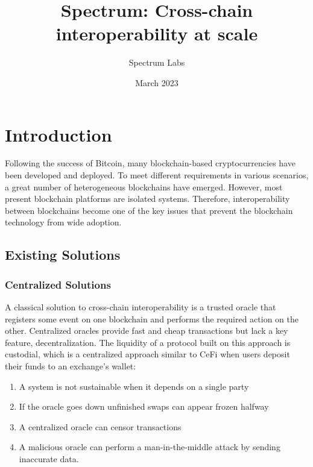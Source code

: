 \documentclass{article}
\title{Spectrum: Cross-chain interoperability at scale}
\author{Spectrum Labs}
\date{March 2023}
\begin{document}
    \pagecolor{SpectrumLavander}
    \begin{sloppypar}

        \maketitle


        \section{Introduction}\label{sec:introduction}

        Following the success of Bitcoin, many blockchain-based cryptocurrencies have been developed and deployed.
        To meet different requirements in various scenarios, a great number of heterogeneous blockchains have emerged.
        However, most present blockchain platforms are isolated systems.
        Therefore, interoperability between blockchains become one of the key issues
        that prevent the blockchain technology from wide adoption.

        \subsection{Existing Solutions}\label{subsec:existing-solutions}

        \subsubsection{Centralized Solutions}\label{subsubsec:centralized-solutions}

        A classical solution to cross-chain interoperability is a trusted oracle that registers some event on one blockchain and performs the required action on the other.
        Centralized oracles provide fast and cheap transactions but lack a key feature, decentralization.
        The liquidity of a protocol built on this approach is custodial, which is a centralized approach similar to CeFi when users deposit their funds to an exchange's wallet:
        \begin{enumerate}
            \item A system is not sustainable when it depends on a single party
            \item If the oracle goes down unfinished swaps can appear frozen halfway
            \item A centralized oracle can censor transactions
            \item A malicious oracle can perform a man-in-the-middle attack by sending inaccurate data.
        \end{enumerate}


\end{sloppypar}
\end{document}
